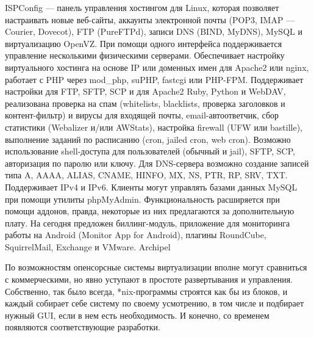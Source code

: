 ISPConfig — панель управления хостингом для Linux, которая позволяет настраивать новые веб-сайты, аккаунты электронной почты (POP3, IMAP — Courier, Dovecot), FTP (PureFTPd), записи DNS (BIND, MyDNS), MySQL и виртуализацию OpenVZ. При помощи одного интерфейса поддерживается управление несколькими физическими серверами. Обеспечивает настройку виртуального хостинга на основе IP или доменных имен для Apache2 или nginx, работает с PHP через mod\_php, suPHP, fastcgi или PHP-FPM. Поддерживает настройки для FTP, SFTP, SCP и для Apache2 Ruby, Python и WebDAV, реализована проверка на спам (whitelists, blacklists, проверка заголовков и контент-фильтр) и вирусы для входящей почты, email-автоответчик, сбор статистики (Webalizer и/или AWStats), настройка firewall (UFW или bastille), выполнение заданий по расписанию (cron, jailed cron, web cron). Возможно использование shell-доступа для пользователей (обычный и jail), SFTP, SCP, авторизация по паролю или ключу. Для DNS-сервера возможно создание записей типа A, AAAA, ALIAS, CNAME, HINFO, MX, NS, PTR, RP, SRV, TXT. Поддерживает IPv4 и IPv6.
Клиенты могут управлять базами данных MySQL при помощи утилиты phpMyAdmin.
Функциональность расширяется при помощи аддонов, правда, некоторые из них предлагаются за дополнительную плату. На сегодня предложен биллинг-модуль, приложение для мониторинга работы на Android (Monitor App for Android), плагины RoundCube, SquirrelMail, Exchange и VMware.
Archipel
 
По возможностям опенсорсные системы виртуализации вполне могут сравниться с коммерческими, но явно уступают в простоте развертывания и управления. Собственно, так было всегда, *nix-программы строятся как бы из блоков, и каждый собирает себе систему по своему усмотрению, в том числе и подбирает нужный GUI, если в нем есть необходимость. И конечно, со временем появляются соответствующие разработки.

